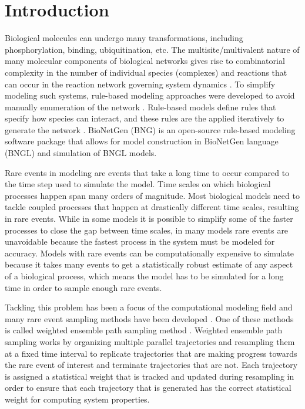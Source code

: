 \documentclass[10pt,letterpaper]{article}
\begin{document}
\section*{Introduction}
Biological molecules can undergo many transformations, including phosphorylation, binding, ubiquitination, etc. The multisite/multivalent nature of many molecular components of biological networks gives rise to combinatorial complexity in the number of individual species (complexes) and reactions that can occur in the reaction network governing system dynamics \cite{hlavacek_complexity_2003}. To simplify modeling such systems, rule-based modeling approaches were developed to avoid manually enumeration of the network \cite{kappa2018,faeder2009rule}. Rule-based models define rules that specify how species can interact, and these rules are the applied iteratively to generate the network \cite{blinov2006graph}. BioNetGen (BNG)\cite{blinov2004bionetgen,faeder2009rule,harris2016bionetgen} is an open-source rule-based modeling software package that allows for model construction in BioNetGen language (BNGL) and simulation of BNGL models.

Rare events in modeling are events that take a long time to occur compared to the time step used to simulate the model. Time scales on which biological processes happen span many orders of magnitude. Most biological models need to tackle coupled processes that happen at drastically different time scales\cite{peters2017reaction}, resulting in rare events. While in some models it is possible to simplify some of the faster processes to close the gap between time scales, in many models rare events are unavoidable because the fastest process in the system must be modeled for accuracy. 
Models with rare events can be computationally expensive to simulate because it takes many events to get a statistically robust estimate of any aspect of a biological process, which means the model has to be simulated for a long time in order to sample enough rare events.


Tackling this problem has been a focus of the computational modeling field and many rare event sampling methods have been developed \cite{wemain,tps1,tps2,ams,ffs}. One of these methods is called weighted ensemble path sampling method \cite{wemain}. Weighted ensemble path sampling works by organizing multiple parallel trajectories and 
resampling them at a fixed time interval to replicate trajectories that are making progress towards the rare event of interest and terminate trajectories that are not. Each trajectory is assigned a statistical weight that is tracked and updated during resampling in order to ensure that each trajectory that is generated has the correct statistical weight for computing system properties.
\end{document}
